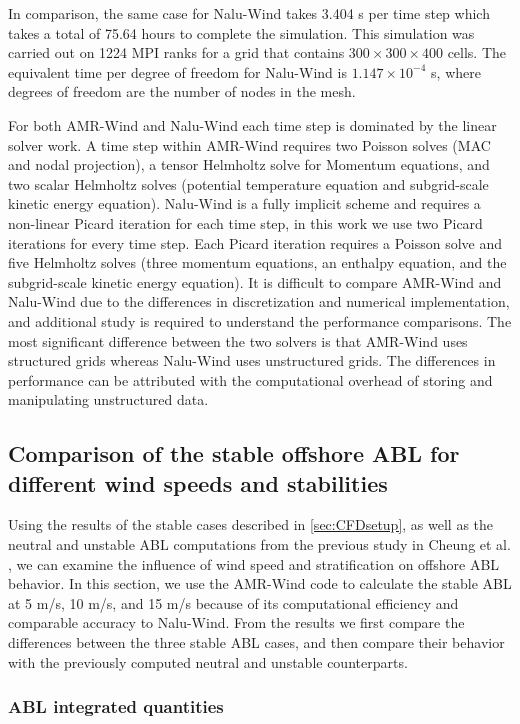 In comparison, the same case for Nalu-Wind takes 3.404 s per time step which
takes a total of 75.64 hours to complete the simulation. This simulation was carried out
on 1224 MPI ranks for a grid that contains $300\times 300 \times 400$ cells. The equivalent
time per degree of freedom for Nalu-Wind is $1.147 \times 10^{-4}$ s, where degrees of freedom
are the number of nodes in the mesh.

For both AMR-Wind and Nalu-Wind each time step is dominated by the linear solver work.
A time step within AMR-Wind requires two Poisson solves (MAC and nodal projection),
a tensor Helmholtz solve for Momentum equations, and two scalar Helmholtz solves
(potential temperature equation and subgrid-scale kinetic energy equation).
Nalu-Wind is a fully implicit scheme and requires a non-linear Picard iteration for each time
step, in this work we use two Picard iterations for every time step.
Each Picard iteration requires a Poisson solve and five Helmholtz solves
(three momentum equations, an enthalpy equation, and the subgrid-scale kinetic energy equation).
It is difficult to compare AMR-Wind and Nalu-Wind due to the differences in discretization and numerical
implementation, and additional study is required to understand the performance comparisons.
The most significant difference between the two solvers is that AMR-Wind uses structured grids
whereas Nalu-Wind uses unstructured grids. The differences in performance can be attributed with the
computational overhead of storing and manipulating unstructured data.


\subsection{Comparison of the stable offshore ABL for different wind speeds and stabilities}

Using the results of the stable cases described in \ref{sec:CFDsetup},
as well as the neutral and unstable ABL computations from the previous
study in Cheung et al. \cite{cheung2020large}, we can examine the
influence of wind speed and stratification on offshore ABL behavior.
In this section, we use the AMR-Wind code to calculate the stable ABL
at 5 m/s, 10 m/s, and 15 m/s because of its computational efficiency
and comparable accuracy to Nalu-Wind.  From the results we first
compare the differences between the three stable ABL cases, and then
compare their behavior with the previously computed neutral and
unstable counterparts.

\subsubsection{\label{sec:stableABLStats} ABL integrated quantities}

